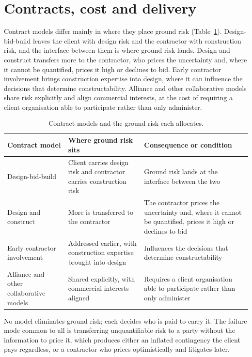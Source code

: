 \section{Contracts, cost and delivery}
\label{sec:contracts-cost-delivery}

Contract models differ mainly in where they place ground risk
(Table~\ref{tab:contract-models}). Design-bid-build
leaves the client with design risk and the contractor with construction risk,
and the interface between them is where ground risk lands. Design and construct
transfers more to the contractor, who prices the uncertainty and, where it
cannot be quantified, prices it high or declines to bid. Early contractor
involvement brings construction expertise into design, where it can influence
the decisions that determine constructability. Alliance and other collaborative
models share risk explicitly and align commercial interests, at the cost of
requiring a client organisation able to participate rather than only
administer.

\begin{table}[htbp]
\caption{Contract models and the ground risk each allocates.}
\label{tab:contract-models}
\centering
\small
\begin{tabularx}{\textwidth}{>{\raggedright\arraybackslash}p{} >{\raggedright\arraybackslash}X >{\raggedright\arraybackslash}X}
\toprule
\textbf{Contract model} & \textbf{Where ground risk sits} & \textbf{Consequence or condition} \\
\midrule
Design-bid-build & Client carries design risk and contractor carries construction risk & Ground risk lands at the interface between the two \\
Design and construct & More is transferred to the contractor & The contractor prices the uncertainty and, where it cannot be quantified, prices it high or declines to bid \\
Early contractor involvement & Addressed earlier, with construction expertise brought into design & Influences the decisions that determine constructability \\
Alliance and other collaborative models & Shared explicitly, with commercial interests aligned & Requires a client organisation able to participate rather than only administer \\
\bottomrule
\end{tabularx}
\end{table}

No model eliminates ground risk; each decides who is paid to carry it. The
failure mode common to all is transferring unquantifiable risk to a party
without the information to price it, which produces either an inflated
contingency the client pays regardless, or a contractor who prices optimistically
and litigates later.

